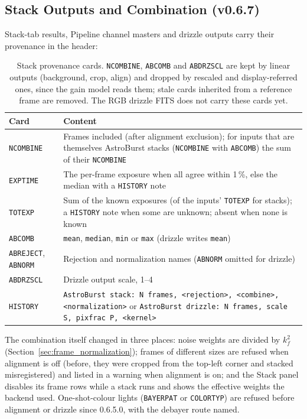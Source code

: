 \documentclass[11pt,a4paper]{article}
\newcommand{\code}[1]{\texttt{\small #1}}
\begin{document}
    \subsection{Stack Outputs and Combination (v0.6.7)}

    Stack-tab results, Pipeline channel masters and drizzle outputs carry their provenance in the header:

    \begin{table}[H]
        \centering
        \small
        \begin{tabularx}{\textwidth}{lX}
            \toprule
            \textbf{Card} & \textbf{Content} \\
            \midrule
            \code{NCOMBINE} & Frames included (after alignment exclusion); for inputs that are themselves AstroBurst stacks (\code{NCOMBINE} with \code{ABCOMB}) the sum of their \code{NCOMBINE} \\
            \code{EXPTIME} & The per-frame exposure when all agree within 1\,\%, else the median with a \code{HISTORY} note \\
            \code{TOTEXP} & Sum of the known exposures (of the inputs' \code{TOTEXP} for stacks); a \code{HISTORY} note when some are unknown; absent when none is known \\
            \code{ABCOMB} & \code{mean}, \code{median}, \code{min} or \code{max} (drizzle writes \code{mean}) \\
            \code{ABREJECT}, \code{ABNORM} & Rejection and normalization names (\code{ABNORM} omitted for drizzle) \\
            \code{ABDRZSCL} & Drizzle output scale, 1--4 \\
            \code{HISTORY} & \code{AstroBurst stack: N frames, <rejection>, <combine>, <normalization>} or \code{AstroBurst drizzle: N frames, scale S, pixfrac P, <kernel>} \\
            \bottomrule
        \end{tabularx}
        \caption{Stack provenance cards. \code{NCOMBINE}, \code{ABCOMB} and \code{ABDRZSCL} are kept by linear outputs (background, crop, align) and dropped by rescaled and display-referred ones, since the gain model reads them; stale cards inherited from a reference frame are removed. The RGB drizzle FITS does not carry these cards yet.}
    \end{table}

    The combination itself changed in three places: noise weights are divided by $k_f^2$ (Section~\ref{sec:frame_normalization}); frames of different sizes are refused when alignment is off (before, they were cropped from the top-left corner and stacked misregistered) and listed in a warning when alignment is on; and the Stack panel disables its frame rows while a stack runs and shows the effective weights the backend used. One-shot-colour lights (\code{BAYERPAT} or \code{COLORTYP}) are refused before alignment or drizzle since 0.6.5.0, with the debayer route named.
\end{document}
